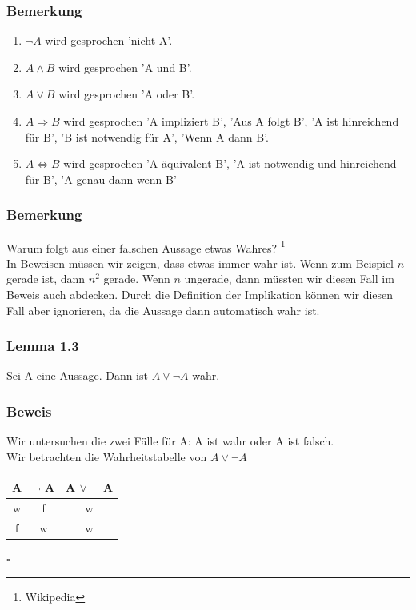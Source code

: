 \documentclass{article}
\begin{document}
\subsubsection*{Bemerkung}
\begin{enumerate}
    \item $\neg A$ wird gesprochen 'nicht A'. 
    \item $A \wedge B$ wird gesprochen 'A und B'. 
    \item $A \vee B$ wird gesprochen 'A oder B'. 
    \item $A \Rightarrow B$ wird gesprochen 'A impliziert B', 'Aus A folgt B', 'A ist hinreichend für B', 'B ist notwendig für A', 'Wenn A dann B'. 
    \item $A \Leftrightarrow B$ wird gesprochen 'A äquivalent B', 'A ist notwendig und hinreichend für B', 'A genau dann wenn B'
\end{enumerate} 
    
\subsubsection*{Bemerkung}
Warum folgt aus einer falschen Aussage etwas Wahres? \footnote{Wikipedia} \\
In Beweisen müssen wir zeigen, dass etwas immer wahr ist. Wenn zum Beispiel $n$ gerade ist, dann $n^2$ gerade. Wenn $n$ ungerade, dann müssten wir diesen Fall im Beweis auch abdecken. Durch die Definition der Implikation können wir diesen Fall aber ignorieren, da die Aussage dann automatisch wahr ist. 

\subsubsection*{Lemma 1.3}
Sei A eine Aussage. Dann ist $A \vee \neg A$ wahr.

\subsubsection*{Beweis}
Wir untersuchen die zwei Fälle für A: A ist wahr oder A ist falsch. \\
Wir betrachten die Wahrheitstabelle von $A \vee \neg A$ 
\begin{center}
    \begin{tabular}{|c|c|c|}
        \hline
        A & $\neg$ A & A $\vee$ $\neg$ A \\
        \hline
        \hline
        w & f & w \\
        f & w & w \\
        \hline
    \end{tabular}
\end{center} $\square$ 
\end{document}
